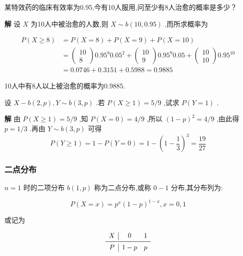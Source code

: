 \begin{example}
	某特效药的临床有效率为0.95,今有10人服用,问至少有8人治愈的概率是多少？
	
	\textbf{解} 设 $ X $ 为10人中被治愈的人数,则 $ X \sim b(10,0.95) $ ,而所求概率为
	
	\[
	\begin{aligned} P(X \geqslant 8) &=P(X=8)+P(X=9)+P(X=10) \\ &=\left( \begin{array}{c}{10} \\ {8}\end{array}\right) 0.95^{8} 0.05^{2}+\left( \begin{array}{c}{10} \\ {9}\end{array}\right) 0.95^{9} 0.05+\left( \begin{array}{c}{10} \\ {10}\end{array}\right) 0.95^{10} \\ &=0.0746+0.3151+0.5988=0.9885 \end{aligned}
	\]
	
	10人中有8人以上被治愈的概率为0.9885.
	
\end{example}

\begin{example}
	设 $ X-b(2, p), Y \sim b(3, p) $ .若 $ P(X \geqslant 1)=5 / 9 $ ,试求 $ P(Y=1) $ .
	
	\textbf{解} 由 $ P(X \geqslant 1)=5 / 9 $ ,知 $ P(X=0)=4/9 $ ,所以 $ (1-p)^{2}=4/9 $ ,由此得 $ p=1/3 $ .再由 $ Y \sim b(3, p) $ 可得
	\[
	P(Y \geqslant 1)=1-P(Y=0)=1-\left(1-\frac{1}{3}\right)^{3}=\frac{19}{27}
	\]
	
\end{example}

\subsubsection{二点分布}

 $ n=1 $ 时的二项分布 $ b(1,p) $ 称为二点分布,或称 $ 0-1 $ 分布,其分布列为:

\begin{equation}
P(X=x)=p^{x}(1-p)^{1-x}, x=0,1 \label{eq:2.4.2}
\end{equation}

或记为

\[
\begin{array}{c|cc}
X     & 0     & 1 \\\midrule
P     & 1-p   & p \\
\end{array}
\]

